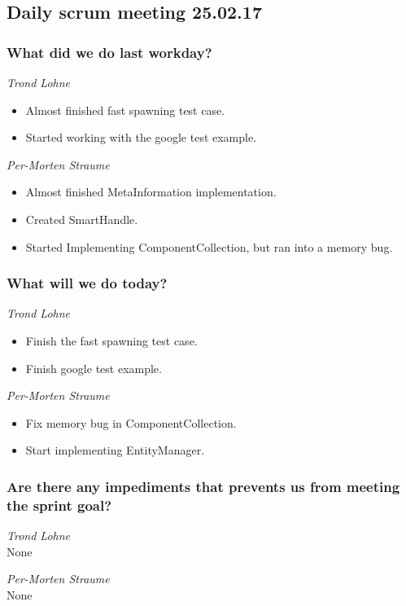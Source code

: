 \documentclass{article}
\begin{document}
\begin{center}
\subsection*{Daily scrum meeting 25.02.17}
\end{center}
\bigskip


\subsubsection*{What did we do last workday?}

\noindent\textit{Trond Lohne}
\begin{itemize}
	\item 
	Almost finished fast spawning test case.
	
	\item 
	Started working with the google test example.
\end{itemize}

\medskip

\noindent\textit{Per-Morten Straume}
\begin{itemize}
	\item 
	Almost finished MetaInformation implementation. 
	
	\item 
	Created SmartHandle.
	
	\item 
	Started Implementing ComponentCollection, but ran into a memory bug.
\end{itemize}


\subsubsection*{What will we do today?}

\noindent\textit{Trond Lohne}
\begin{itemize}
	\item 
	Finish the fast spawning test case.
	
	\item 
    Finish google test example.
\end{itemize}

\medskip

\noindent\textit{Per-Morten Straume}
\begin{itemize}
	\item 
    Fix memory bug in ComponentCollection.
	
	\item 
	Start implementing EntityManager.	
\end{itemize}


\subsubsection*{Are there any impediments that prevents us from meeting the sprint goal?}

\noindent\textit{Trond Lohne}\\
None

\medskip

\noindent\textit{Per-Morten Straume}\\
None
\end{document}
